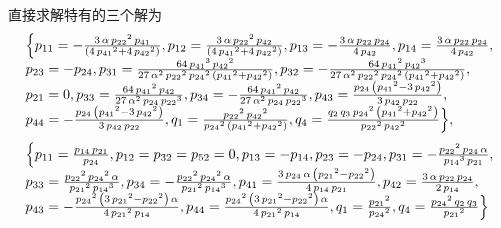 直接求解特有的三个解为
\begin{equation}
\renewcommand{\arraystretch}{1.2}
\begin{array}{l}
\dbrace{
{{p}_{11}}=-\frac{3\,\alpha\,{{{p}_{22}}}^{2}\,{{p}_{41}}}{\left( 4\,{{{p}_{41}}}^{2}+4\,{{{p}_{42}}}^{2}\right) },
{{p}_{12}}=\frac{3\,\alpha\,{{{p}_{22}}}^{2}\,{{p}_{42}}}{\left( 4\,{{{p}_{41}}}^{2}+4\,{{{p}_{42}}}^{2}\right) },
{{p}_{13}}=-\frac{3\,\alpha\,{{p}_{22}}\,{{p}_{24}}}{4\,{{p}_{42}}},
{{p}_{14}}=\frac{3\,\alpha\,{{p}_{22}}\,{{p}_{24}}}{4\,{{p}_{42}}},\\ 
{{p}_{23}}=-{{p}_{24}},
{{p}_{31}}=\frac{64\,{{{p}_{41}}}^{3}\,{{{p}_{42}}}^{2}}{27\,{\alpha}^{2}\,{{{p}_{22}}}^{2}\,{{{p}_{24}}}^{2}\,\left( {{{p}_{41}}}^{2}+{{{p}_{42}}}^{2}\right) },
{{p}_{32}}=-\frac{64\,{{{p}_{41}}}^{2}\,{{{p}_{42}}}^{3}}{27\,{\alpha}^{2}\,{{{p}_{22}}}^{2}\,{{{p}_{24}}}^{2}\,\left( {{{p}_{41}}}^{2}+{{{p}_{42}}}^{2}\right) },\\ 
{{p}_{21}}=0,
{{p}_{33}}=\frac{64\,{{{p}_{41}}}^{2}\,{{p}_{42}}}{27\,{\alpha}^{2}\,{{p}_{24}}\,{{{p}_{22}}}^{3}},
{{p}_{34}}=-\frac{64\,{{{p}_{41}}}^{2}\,{{p}_{42}}}{27\,{\alpha}^{2}\,{{p}_{24}}\,{{{p}_{22}}}^{3}},
{{p}_{43}}=\frac{{{p}_{24}}\,\left( {{{p}_{41}}}^{2}-3\,{{{p}_{42}}}^{2}\right) }{3\,{{p}_{42}}\,{{p}_{22}}},\\ 
{{p}_{44}}=-\frac{{{p}_{24}}\,\left( {{{p}_{41}}}^{2}-3\,{{{p}_{42}}}^{2}\right) }{3\,{{p}_{42}}\,{{p}_{22}}},
{{q}_{1}}=\frac{{{{p}_{22}}}^{2}\,{{{p}_{42}}}^{2}}{{{{p}_{24}}}^{2}\,\left( {{{p}_{41}}}^{2}+{{{p}_{42}}}^{2}\right) },
{{q}_{4}}=\frac{{{q}_{2}}\,{{q}_{3}}\,{{{p}_{24}}}^{2}\,\left( {{{p}_{41}}}^{2}+{{{p}_{42}}}^{2}\right) }{{{{p}_{22}}}^{2}\,{{{p}_{42}}}^{2}}
}, 
\end{array}
\end{equation}
\begin{equation}
\renewcommand{\arraystretch}{1.2}
\begin{array}{l}
\dbrace{
{{p}_{11}}=\frac{{{p}_{14}}\,{{p}_{21}}}{{{p}_{24}}},
p_{12}=p_{32}=p_{52}=0,
{{p}_{13}}=-{{p}_{14}},
{{p}_{23}}=-{{p}_{24}},
{{p}_{31}}=-\frac{{{{p}_{22}}}^{2}\,{{p}_{24}}\,\alpha}{{{{p}_{14}}}^{3}\,{{p}_{21}}},\\ 
{{p}_{33}}=\frac{{{{p}_{22}}}^{2}\,{{{p}_{24}}}^{2}\,\alpha}{{{{p}_{21}}}^{2}\,{{{p}_{14}}}^{3}},
{{p}_{34}}=-\frac{{{{p}_{22}}}^{2}\,{{{p}_{24}}}^{2}\,\alpha}{{{{p}_{21}}}^{2}\,{{{p}_{14}}}^{3}},
{{p}_{41}}=\frac{3\,{{p}_{24}}\,\alpha\,\left( {{{p}_{21}}}^{2}-{{{p}_{22}}}^{2}\right) }{4\,{{p}_{14}}\,{{p}_{21}}},
{{p}_{42}}=\frac{3\,\alpha\,{{p}_{22}}\,{{p}_{24}}}{2\,{{p}_{14}}},\\ 
{{p}_{43}}=-\frac{{{{p}_{24}}}^{2}\,\left( 3\,{{{p}_{21}}}^{2}-{{{p}_{22}}}^{2}\right) \,\alpha}{4\,{{{p}_{21}}}^{2}\,{{p}_{14}}},
{{p}_{44}}=\frac{{{{p}_{24}}}^{2}\,\left( 3\,{{{p}_{21}}}^{2}-{{{p}_{22}}}^{2}\right) \,\alpha}{4\,{{{p}_{21}}}^{2}\,{{p}_{14}}},
{{q}_{1}}=\frac{{{{p}_{21}}}^{2}}{{{{p}_{24}}}^{2}},
{{q}_{4}}=\frac{{{{p}_{24}}}^{2}\,{{q}_{2}}\,{{q}_{3}}}{{{{p}_{21}}}^{2}}
}
\end{array}
\end{equation}

